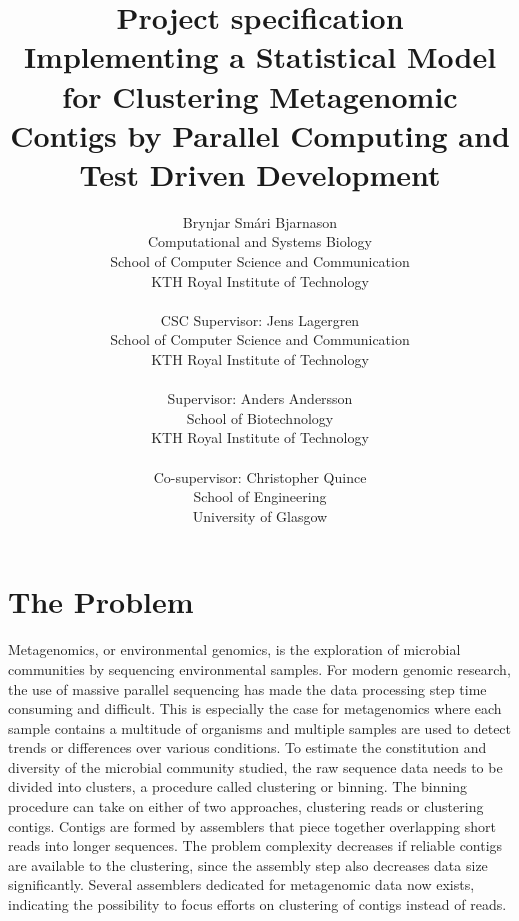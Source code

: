 \documentclass{article}
\begin{document}
\title {\onehalfspacing Project specification \\ \singlespacing Implementing a Statistical Model for Clustering Metagenomic Contigs by Parallel Computing and Test Driven Development}
\author{Brynjar Smári Bjarnason\\Computational and Systems Biology\\ School of Computer Science and Communication\\KTH Royal Institute of Technology \\ \\ 
        CSC Supervisor: Jens Lagergren\\School of Computer Science and Communication \\ KTH Royal Institute of Technology\\ \\
        Supervisor: Anders Andersson\\School of Biotechnology \\ KTH Royal Institute of Technology\\ \\
        Co-supervisor: Christopher Quince\\School of Engineering\\University of Glasgow}

\maketitle
\pagebreak
\section*{The Problem}
Metagenomics, or environmental genomics, is the exploration of microbial communities by sequencing environmental samples. For modern genomic research, the use of massive parallel sequencing has made the data processing step time consuming and difficult. This is especially the case for metagenomics where each sample contains a multitude of organisms and multiple samples are used to detect trends or differences over various conditions. To estimate the constitution and diversity of the microbial community studied, the raw sequence data needs to be divided into clusters, a procedure called clustering or binning. The binning procedure can take on either of two approaches, clustering reads or clustering contigs. Contigs are formed by assemblers that piece together overlapping short reads into longer sequences. The problem complexity decreases if reliable contigs are available to the clustering, since the assembly step also decreases data size significantly. Several assemblers dedicated for metagenomic data now exists, indicating the possibility to focus efforts on clustering of contigs instead of reads.
\end{document}
